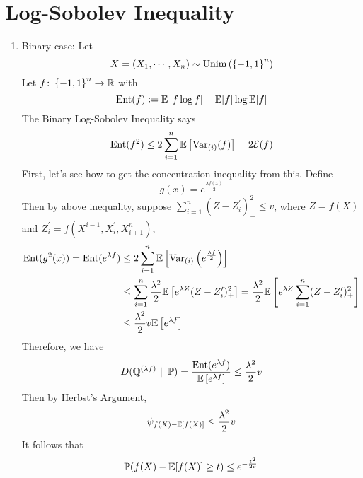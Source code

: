 \section{Log-Sobolev Inequality}
\begin{enumerate}[label=\arabic{*}.]
	\item Binary case: Let
	\begin{equation*}
	    X = (X_1,\cdots,X_n) \sim \operatorname{Unim}\left(\left\{-1,1\right\}^n\right)
	\end{equation*}
	Let $f \colon \left\{-1,1\right\}^n \rightarrow \mathbb{R}$ with
	\begin{equation*}
	    \operatorname{Ent}(f) \vcentcolon= \mathbb{E}\left[f\log f\right] - \mathbb{E}[f]\log \mathbb{E}[f]
	\end{equation*}
	The Binary Log-Sobolev Inequality says
	\begin{equation*}
	    \operatorname{Ent}(f^2) \leq 2\sum_{i=1}^n\mathbb{E}\left[\operatorname{Var}_{(i)}(f)\right] = 2\mathcal{E}(f)
	\end{equation*}
	First, let's see how to get the concentration inequality from this. Define
	\begin{equation*}
	    g(x) = e^{\frac{\lambda f(x)}{2}}
	\end{equation*}
	Then by above inequality, suppose $\sum_{i=1}^n (Z-Z_i^\prime)_+^2 \leq v$, where $Z=f(X)$ and $Z_i^\prime = f(X^{i-1},X_i^\prime,X_{i+1}^n)$,
	\begin{equation*}
	    \begin{aligned}
	    	\operatorname{Ent}(g^2(x)) = \operatorname{Ent}(e^{\lambda f}) &\leq 2\sum_{i=1}^n\mathbb{E}\left[\operatorname{Var}_{(i)}\left(e^{\frac{\lambda f}{2}}\right)\right] \\
	    	&\leq \sum_{i=1}^n \frac{\lambda^2}{2}\mathbb{E}\left[e^{\lambda Z}(Z-Z_i^\prime)_+^2\right] = \frac{\lambda^2}{2}\mathbb{E}\left[e^{\lambda Z}\sum_{i=1}^n (Z-Z_i^\prime)_+^2\right] \\
	    	&\leq \frac{\lambda^2}{2}v\mathbb{E}\left[e^{\lambda f}\right]
	    \end{aligned}
	\end{equation*}
	Therefore, we have
	\begin{equation*}
	    D(\mathbb{Q}^{(\lambda f)} ~\Vert~ \mathbb{P}) = \frac{\operatorname{Ent}(e^{\lambda f})}{\mathbb{E}\left[e^{\lambda f}\right]} \leq \frac{\lambda^2}{2}v
	\end{equation*}
	Then by Herbst’s Argument,
	\begin{equation*}
	    \psi_{f(X) - \mathbb{E}[f(X)]} \leq \frac{\lambda^2}{2}v
	\end{equation*}
	It follows that
	\begin{equation*}
	    \mathbb{P}(f(X) - \mathbb{E}[f(X)] \geq t) \leq e^{-\frac{t^2}{2v}}
	\end{equation*}


\end{enumerate}
